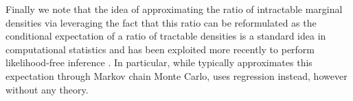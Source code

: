 Finally we note that the idea of approximating the ratio of intractable marginal densities via leveraging the fact that this ratio can be reformulated as the conditional expectation of a ratio of tractable densities is a standard idea in computational statistics \citep{meng1996simulating} and has been exploited more recently to perform likelihood-free inference \citep{brehmer2020mining}. In particular, while  \cite{meng1996simulating} typically approximates this expectation through Markov chain Monte Carlo, \cite{brehmer2020mining} uses regression instead, however without any theory.



